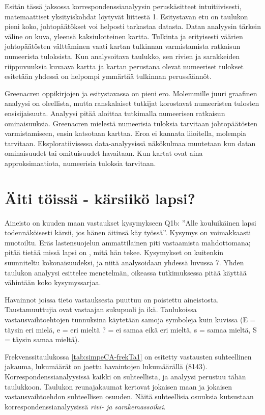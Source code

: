 \documentclass[
  finnish,
]{book}
\begin{document}
Esitän tässä jaksossa korrespondenssianalyysin peruskäsitteet intuitiivisesti,
matemaattiset yksityiskohdat löytyvät liittestä 1. Esitystavan etu on taulukon
pieni koko, johtopäätökset voi helposti tarkastaa datasta. Datan analyysin tärkein
väline on kuva, yleensä kaksiulotteinen kartta. Tulkinta ja erityisesti väärien
johtopäätösten välttäminen vaati kartan tulkinnan varmistamista ratkaisun
numeerista tuloksista. Kun analysoitava taulukko, sen rivien ja sarakkeiden
riippuvuuksia kuvaava kartta ja kartan perustana olevat numeeriset tulokset
esitetään yhdessä on helpompi ymmärtää tulkinnan perussäännöt.

Greenacren oppikirjojen ja \citet{RefWorks:doc:5a857a43e4b0ed2d44664d75} esitystavassa
on pieni ero. Molemmille juuri graafinen analyysi on oleellista, mutta ranskalaiset
tutkijat korostavat numeeristen tulosten ensisijaisuuta. Analyysi pitää aloittaa
tutkimalla numeerisen ratkaisun ominaisuuksia. Greenacren mielestä numeerisia tuloksia
tarvitaan johtopäätösten varmistamiseen, ensin katsotaan karttaa. Eroa ei kannata
liioitella, molempia tarvitaan. Eksploratiivisessa data-analyysissä näkökulmaa
muutetaan kun datan ominaisuudet tai omituisuudet havaitaan. Kun kartat ovat aina
approksimaatiota, numeerisia tuloksia tarvitaan.

\hypertarget{uxe4iti-tuxf6issuxe4---kuxe4rsiikuxf6-lapsi}{%
\section{Äiti töissä - kärsiikö lapsi?}\label{uxe4iti-tuxf6issuxe4---kuxe4rsiikuxf6-lapsi}}

Aineisto on kuuden maan vastaukset kysymykseen Q1b: ''Alle kouluikäinen lapsi
todennäköisesti kärsii, jos hänen äitinsä käy työssä''. Kysymys on voimakkaasti
muotoiltu. Eräs lastensuojelun ammattilainen piti vastaamista mahdottomana; pitää
tietää missä lapsi on , mitä hän tekee. Kysymykset on kuitenkin suunniteltu
kokonaisuudeksi, ja niitä analysoidaan yhdessä luvussa 7. Yhden taulukon analyysi
esittelee menetelmän, oikeassa tutkimuksessa pitää käyttää vähintään koko
kysymyssarjaa.

Havainnot joissa tieto vastauksesta puuttuu on poistettu aineistosta.
Taustamuuttujia ovat vastaajan sukupuoli ja ikä. Taulukoissa vastausvaihtoehtojen
tunnuksina käytetään samoja symboleja kuin kuvissa (E = täysin eri mielä,
e = eri mieltä ? = ei samaa eikä eri mieltä, s = samaa mieltä, S = täysin samaa
mieltä).

Frekvenssitaulukossa \ref{tab:simpeCA-frekTa1} on esitetty vastausten suhteellinen jakauma,
lukumäärät on jaettu havaintojen lukumäärällä (8143). Korrespondenssianalyysissä
kaikki on suhteellista, ja analyysi perustuu tähän taulukkoon. Taulukon
reunajakaumat kertovat jokaisen maan ja jokaisen vastausvaihtoehdon suhteellisen
osuuden. Näitä suhteellisia osuuksia kutsustaan korrespondenssianalyysissä
\emph{rivi- ja sarakemassoiksi}.
\end{document}
